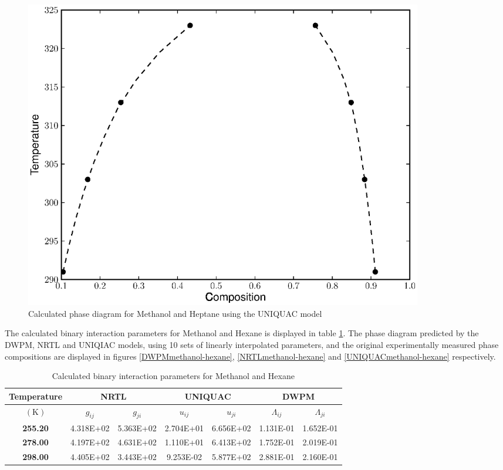 \begin{figure}[hp]
\centering
\includegraphics[width = 0.85\textwidth]{Results_Parts/BinaryParams/methanol-heptane/UNIQUAC/PhaseDiagram.eps}
\caption{Calculated phase diagram for Methanol and Heptane using the UNIQUAC model} \label{UNIQUACmethanol-heptane}
\end{figure}	

\clearpage


The calculated binary interaction parameters for Methanol and Hexane is displayed in table \ref{methanol-hexaneTable}. The phase diagram predicted by the DWPM, NRTL and UNIQIAC models, using 10 sets of linearly interpolated parameters, and the original experimentally measured phase compositions are displayed in figures \ref{DWPMmethanol-hexane}, \ref{NRTLmethanol-hexane} and \ref{UNIQUACmethanol-hexane} respectively.\\

\begin{table}
\begin{tabularx}{\textwidth}{c|cc|cc|cc}
\hline
\textbf{Temperature}&\multicolumn{2}{c|}{\textbf{NRTL}}&\multicolumn{2}{c|}{\textbf{UNIQUAC}}&\multicolumn{2}{c}{\textbf{DWPM}}\\
\hline
\hline 
$\left(\mathrm{K}\right)$&$g_{ij}$&$g_{ji}$&$u_{ij}$&$u_{ji}$&$\Lambda_{ij}$&$\Lambda_{ji}$\\
\hline
\textbf{ 255.20 } & 4.318E+02 & 5.363E+02 & 2.704E+01 & 6.656E+02 & 1.131E-01 & 1.652E-01\\
\textbf{ 278.00 } & 4.197E+02 & 4.631E+02 & 1.110E+01 & 6.413E+02 & 1.752E-01 & 2.019E-01\\
\textbf{ 298.00 } & 4.405E+02 & 3.443E+02 & 9.253E-02 & 5.877E+02 & 2.881E-01 & 2.160E-01\\
\hline
\end{tabularx}\\
\caption{Calculated binary interaction parameters for Methanol and Hexane} \label{methanol-hexaneTable}
\end{table}

